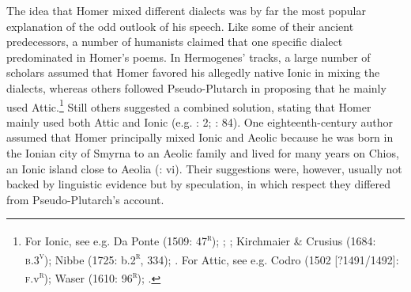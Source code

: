 The idea that Homer mixed different dialects was by far the most popular explanation of the odd outlook of his speech. Like some of their ancient predecessors, a number of humanists claimed that one specific dialect predominated in Homer’s poems. In Hermogenes’ tracks, a large number of scholars assumed that Homer favored his allegedly native Ionic in mixing the dialects, whereas others followed Pseudo-Plutarch in proposing that he mainly used Attic.\footnote{For Ionic, see e.g. Da Ponte (1509: 47\textsc{\textsuperscript{r}}); \citet[215]{Ringelbergh1541}; \citet[167]{Labbe1639}; Kirchmaier \& Crusius (1684: \textsc{b.3}\textsc{\textsuperscript{v}}); Nibbe (1725: b.2\textsc{\textsuperscript{r}}, 334); \citet[161]{Gesner1774}. For Attic, see e.g. Codro (1502 [?1491/1492]: \textsc{f.}v\textsc{\textsuperscript{r}}); Waser (1610: 96\textsc{\textsuperscript{r}}); \citet[514]{Fabricius1711}.} Still others suggested a combined solution, stating that Homer mainly used both Attic and Ionic (e.g. \citealt{Schmidt1604}: 2; \citealt{Rhenius1626}: 84). One eighteenth-century author assumed that Homer principally mixed Ionic and Aeolic because he was born in the Ionian city of Smyrna to an Aeolic family and lived for many years on Chios, an Ionic island close to Aeolia (\citealt{Reynolds1752}: vi). Their suggestions were, however, usually not backed by linguistic evidence but by speculation, in which respect they differed from Pseudo-Plutarch’s account.

